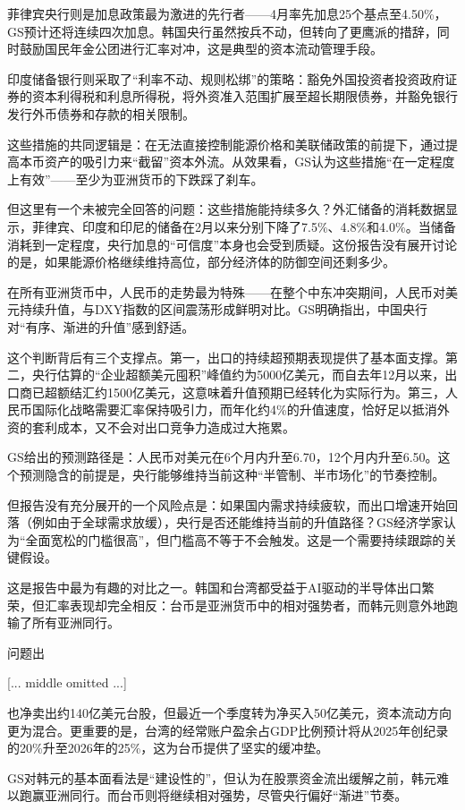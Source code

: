 \documentclass[11pt]{ctexart}
\begin{document}
菲律宾央行则是加息政策最为激进的先行者——4月率先加息25个基点至4.50\%，GS预计还将连续四次加息。韩国央行虽然按兵不动，但转向了更鹰派的措辞，同时鼓励国民年金公团进行汇率对冲，这是典型的资本流动管理手段。

印度储备银行则采取了“利率不动、规则松绑”的策略：豁免外国投资者投资政府证券的资本利得税和利息所得税，将外资准入范围扩展至超长期限债券，并豁免银行发行外币债券和存款的相关限制。

这些措施的共同逻辑是：在无法直接控制能源价格和美联储政策的前提下，通过提高本币资产的吸引力来“截留”资本外流。从效果看，GS认为这些措施“在一定程度上有效”——至少为亚洲货币的下跌踩了刹车。

但这里有一个未被完全回答的问题：这些措施能持续多久？外汇储备的消耗数据显示，菲律宾、印度和印尼的储备在2月以来分别下降了7.5\%、4.8\%和4.0\%。当储备消耗到一定程度，央行加息的“可信度”本身也会受到质疑。这份报告没有展开讨论的是，如果能源价格继续维持高位，部分经济体的防御空间还剩多少。

在所有亚洲货币中，人民币的走势最为特殊——在整个中东冲突期间，人民币对美元持续升值，与DXY指数的区间震荡形成鲜明对比。GS明确指出，中国央行对“有序、渐进的升值”感到舒适。

这个判断背后有三个支撑点。第一，出口的持续超预期表现提供了基本面支撑。第二，央行估算的“企业超额美元囤积”峰值约为5000亿美元，而自去年12月以来，出口商已超额结汇约1500亿美元，这意味着升值预期已经转化为实际行为。第三，人民币国际化战略需要汇率保持吸引力，而年化约4\%的升值速度，恰好足以抵消外资的套利成本，又不会对出口竞争力造成过大拖累。

GS给出的预测路径是：人民币对美元在6个月内升至6.70，12个月内升至6.50。这个预测隐含的前提是，央行能够维持当前这种“半管制、半市场化”的节奏控制。

但报告没有充分展开的一个风险点是：如果国内需求持续疲软，而出口增速开始回落（例如由于全球需求放缓），央行是否还能维持当前的升值路径？GS经济学家认为“全面宽松的门槛很高”，但门槛高不等于不会触发。这是一个需要持续跟踪的关键假设。

这是报告中最为有趣的对比之一。韩国和台湾都受益于AI驱动的半导体出口繁荣，但汇率表现却完全相反：台币是亚洲货币中的相对强势者，而韩元则意外地跑输了所有亚洲同行。

问题出

[... middle omitted ...]

也净卖出约140亿美元台股，但最近一个季度转为净买入50亿美元，资本流动方向更为混合。更重要的是，台湾的经常账户盈余占GDP比例预计将从2025年创纪录的20\%升至2026年的25\%，这为台币提供了坚实的缓冲垫。

GS对韩元的基本面看法是“建设性的”，但认为在股票资金流出缓解之前，韩元难以跑赢亚洲同行。而台币则将继续相对强势，尽管央行偏好“渐进”节奏。
\end{document}
